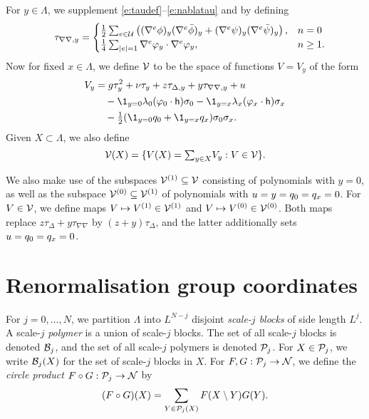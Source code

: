 For $y \in \Lambda$, we supplement \eqref{e:taudef}--\eqref{e:nablatau} and 
by defining
\begin{equation}
\label{e:tauphi2}
\quad \tau_{\nabla\nabla,y}
	=
\begin{cases}
\frac 12 \sum_{e \in \mathcal{U}}
\left(
	(\nabla^e \phi)_y (\nabla^e \bar\phi)_y +
	(\nabla^e \psi)_y (\nabla^e \bar\psi)_y
\right),
	& n = 0 \\
\frac{1}{4} \sum_{|e| = 1} \nabla^e \varphi_y \cdot \nabla^e \varphi_y,
	& n \ge 1.
\end{cases}
\end{equation}
Now for fixed $x \in \Lambda$,
we define $\mathcal{V}$ to be the space of functions $V=V_y$ of the form 
\begin{align}
\lbeq{Vy}
V_y
	&=
g \tau_y^2 + \nu \tau_y + z \tau_{\Delta,y} + y \tau_{\nabla\nabla,y} + u
	\nnb&\quad
- \1_{y=\pp}\lambda_{\pp}(\varphi_{\pp} \cdot {\sf h})\sigma_\pp
- \1_{y=\qq}\lambda_{\qq}(\varphi_{\qq} \cdot {\sf h})\sigma_\qq
	\nnb&\quad
- \textstyle{\frac 12} (\1_{y=\pp} q_\pp + \1_{y=\qq}q_\qq )\sigma_\pp\sigma_\qq.
\end{align}
Given $X \subset \Lambda$, we also define
\begin{equation}
\label{e:Vcalesig}
\mathcal{V}(X) = \{V(X) = \textstyle{\sum_{y\in X}} V_y : V \in \mathcal{V} \}.
\end{equation}

We also make use of the subspaces $\mathcal{V}^{(1)} \subseteq \mathcal{V}$ consisting of polynomials with $y = 0$, as well as the subspace
$\mathcal{V}^{(0)} \subseteq \mathcal{V}^{(1)}$ of polynomials with
$u = y =   q_0=q_x = 0$.
For $V \in \mathcal{V}$, we define maps $V \mapsto V^{(1)} \in \mathcal{V}^{(1)}$
and $V \mapsto V^{(0)} \in \mathcal{V}^{(0)}$. Both maps replace
$z\tau_{\Delta}+y\tau_{\nabla\nabla}$ by
$(z+y)\tau_{\Delta}$, and the latter
additionally sets
$u = q_0 = q_x = 0$.


\section{Renormalisation group coordinates}
\label{sec:rgcoord}

For $j=0,\ldots, N$, we partition $\Lambda$ into $L^{N-j}$ disjoint
\emph{scale-$j$ blocks} of side length $L^j$.
A scale-$j$ \emph{polymer} is a union of scale-$j$ blocks.
The set of all scale-$j$ blocks is denoted $\mathcal{B}_j$, and
the set of all scale-$j$ polymers is denoted $\mathcal{P}_j$.
For $X \in \mathcal{P}_j$, we write $\mathcal{B}_j(X)$ for the set of scale-$j$ blocks in $X$.
For $F, G : \mathcal{P}_j \rightarrow \mathcal{N}$, we define the \emph{circle product} $F \circ G : \mathcal{P}_j \rightarrow \mathcal{N}$ by
\begin{equation}
(F \circ G)(X) = \sum_{Y\in\mathcal{P}_j(X)} F(X \setminus Y) G(Y).
\end{equation}

